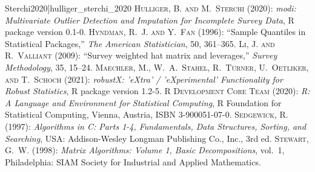 \documentclass[a4paper,oneside,11pt,DIV=12]{scrartcl}
\begin{document}
\begin{thebibliography}{14}
{	Sterchi}{2020}]{hulliger_sterchi_2020}
	\textsc{Hulliger, B. and M.~Sterchi} (2020): \emph{modi: Multivariate
	Outlier Detection and Imputation for Incomplete Survey Data}, {R}
	package version 0.1-0.
	\textsc{Hyndman, R.~J. and Y.~Fan} (1996): \enquote{Sample Quantiles in
	Statistical Packages,} \emph{The American Statistician}, 50, 361--365.
	\textsc{Li, J. and R.~Valliant} (2009): \enquote{Survey weighted hat
	matrix and leverages,} \emph{Survey Methodology}, 35, 15--24.
 \textsc{Maechler, M.,
	W.~A.~Stahel, R.~Turner, U.~Oetliker, and T.~Schoch} (2021):
	\emph{robustX: 'eXtra' / 'eXperimental' Functionality for Robust
	Statistics}, {R} package version 1.2-5.
	\textsc{{R Development Core Team}} (2020): \emph{R: A Language and
	Environment for Statistical Computing}, R Foundation for Statistical
	Computing, Vienna, Austria, {ISBN} 3-900051-07-0.
\textsc{Sedgewick, R.} (1997): \emph{Algorithms in C: Parts 1-4, Fundamentals,
	Data Structures, Sorting, and Searching}, USA: Addison-Wesley Longman
	Publishing Co., Inc., 3rd ed.
	\textsc{Stewart, G.~W.} (1998): \emph{Matrix Algorithms: Volume 1, Basic
	Decompositions}, vol.~1, Philadelphia: SIAM Society for Industrial and
	Applied Mathematics.
\end{thebibliography}
\end{document}
